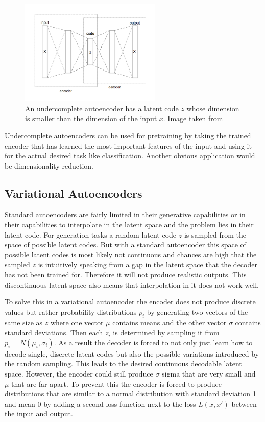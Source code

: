 \begin{figure}[h]
    \centering
    \includegraphics[width=0.6\textwidth]{images/figures/Autoencoder_structure.png}
    \caption{An undercomplete autoencoder has a latent code $z$ whose dimension is smaller than the 
    dimension of the input $x$.
    Image taken from \parencite{2015-Chervinskii-autoencoder}} \label{figure_undercomplete_ae}
\end{figure}

Undercomplete autoencoders can be used for pretraining by taking the trained encoder that has 
learned the most important features of the input and using it for the actual desired task like 
classification. Another obvious application would be dimensionality reduction.


\subsection{Variational Autoencoders} \label{vae_background}

Standard autoencoders are fairly limited in their generative capabilities or in their capabilities
to interpolate in the latent space and the problem lies
in their latent code. For generation tasks a random latent code $z$ is sampled from the space of
possible latent codes. But with a standard autoencoder this space of possible latent codes is most
likely not continuous and chances are high that the sampled $z$ is intuitively speaking
from a gap in the latent space that the decoder has not been trained for. Therefore it will not
produce realistic outputs. This discontinuous latent space also means that interpolation in it
does not work well.

To solve this in a variational autoencoder the encoder does not produce discrete values but rather
probability distributions $p_{i}$ by generating two vectors of the same size as $z$ where one vector $\mu$
contains means and the other vector $\sigma$ contains standard deviations.
Then each $z_{i}$ is determined by sampling it from $p_{i}=N(\mu_{i},\sigma_{i})$.
As a result the decoder is forced to not 
only just learn how to decode single, discrete latent codes but also the possible variations
introduced by the random sampling. This leads to the desired continuous decodable latent space.
However, the encoder could still produce $\sigma$ sigma that are very small and $\mu$ that are far apart.
To prevent this the encoder is forced to produce distributions that are similar to a normal
distribution with standard deviation 1 and mean 0 by adding a second loss function next to the
loss $L(x,x')$ between the input and output.

